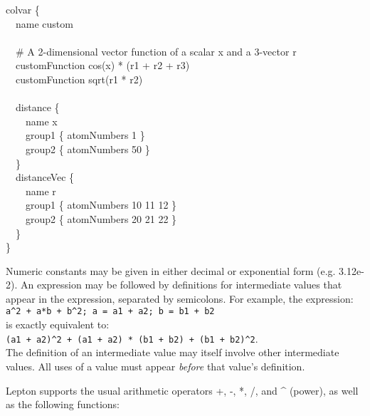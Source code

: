 {\begin{cvexampleinput}
\-colvar \{\\
\-~~name custom\\
\\
\-~~\# A 2-dimensional vector function of a scalar x and a 3-vector r\\
\-~~customFunction cos(x) * (r1 + r2 + r3)\\
\-~~customFunction sqrt(r1 * r2)\\
\\
\-~~distance \{\\
\-~~~~name x\\
\-~~~~group1 \{ atomNumbers 1 \}\\
\-~~~~group2 \{ atomNumbers 50 \}\\
\-~~\}\\
\-~~distanceVec \{\\
\-~~~~name r\\
\-~~~~group1 \{ atomNumbers 10 11 12 \}\\
\-~~~~group2 \{ atomNumbers  20 21 22 \}\\
\-~~\}\\
\}
\end{cvexampleinput}

Numeric constants may be given in either decimal or exponential form (e.g. 3.12e-2).
An expression may be followed by definitions for intermediate values that
appear in the expression, separated by semicolons.
For example, the expression:\\
\texttt{a\^{}2 + a*b + b\^{}2; a = a1 + a2; b = b1 + b2}\\
is exactly equivalent to:\\
\texttt{(a1 + a2)\^{}2 + (a1 + a2) * (b1 + b2) + (b1 + b2)\^{}2}.\\
The definition of an intermediate value may itself involve other intermediate values.
All uses of a value must appear \textit{before} that value's definition.

Lepton supports the usual arithmetic operators +, -, *, /, and \^{} (power), as well as the following functions:

}
